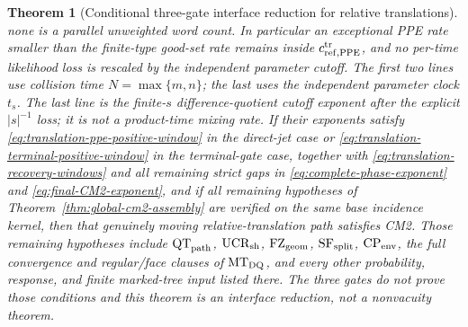 \documentclass[11pt]{article}
\newtheorem{theorem}{Theorem}[section]
\begin{document}
\begin{theorem}[Conditional three-gate interface reduction for relative translations]
none is a parallel unweighted word count.  In particular an exceptional
PPE rate smaller than the finite-type good-set rate remains inside
$c_{{\rm ref},{\rm PPE}}^{\rm tr}$, and no per-time likelihood loss is
rescaled by the independent parameter cutoff.  The first two lines use collision
time $N=\max\{m,n\}$; the last uses the independent parameter clock $t_s$.
The last line is the finite-$s$
difference-quotient cutoff exponent after the explicit $|s|^{-1}$ loss; it
is not a product-time mixing rate.  If their exponents satisfy
\eqref{eq:translation-ppe-positive-window} in the direct-jet case or
\eqref{eq:translation-terminal-positive-window} in the terminal-gate case,
together with \eqref{eq:translation-recovery-windows} and all remaining strict gaps in
\eqref{eq:complete-phase-exponent} and
\eqref{eq:final-CM2-exponent}, and if \emph{all} remaining hypotheses of
Theorem~\ref{thm:global-cm2-assembly} are verified on the same base incidence
kernel, then that genuinely moving relative-translation path satisfies CM2.
Those remaining hypotheses include $\mathrm{QT}_{\rm path}$,
$\mathrm{UCR}_{\rm sh}$, $\mathrm{FZ}_{\rm geom}$,
$\mathrm{SF}_{\rm split}$, $\mathrm{CP}_{\rm env}$, the full convergence
and regular/face clauses of $\mathrm{MT}_{\rm DQ}$, and every other
probability, response, and finite marked-tree input listed there.  The three
gates do not prove those conditions and this theorem is an interface
reduction, not a nonvacuity theorem.
\end{theorem}
\end{document}
